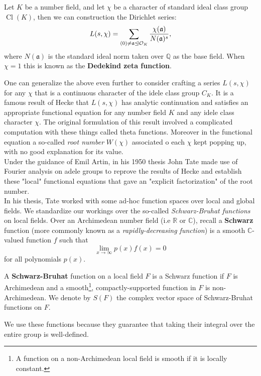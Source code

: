 \documentclass[11pt, x11names]{book}
\newcommand{\qq}{\mathbb{Q}}
\newcommand{\rr}{\mathbb{R}}
\newcommand{\cc}{\mathbb{C}}
\newcommand{\fraka}{\mathfrak{a}}
\newcommand{\ideal}{\trianglelefteq}
\DeclareMathOperator{\cl}{Cl}
\begin{document}
\begin{example}
\label{example: Generalized Dedekind Zeta}
Let $K$ be a number field, and let $\chi$ be a character of standard ideal class group $\cl(K)$, then we can construction the Dirichlet series:
\begin{equation*}
    L(s, \chi) = \sum_{(0) \neq \fraka \ideal \calo_K} \frac{\chi(\fraka)}{N(\fraka)^s},
\end{equation*}
where $N(\fraka)$ is the standard ideal norm taken over $\qq$ as the base field. When $\chi = 1$ this is known as the \textbf{Dedekind zeta function}.
\end{example}

One can generalize the above even further to consider crafting a series $L(s, \chi)$ for any $\chi$ that is a continuous character of the idele class group $C_K$. It is a famous result of Hecke that $L(s, \chi)$ has analytic continuation and satisfies an appropriate functional equation for any number field $K$ and any idele class character $\chi$. The original formulation of this result involved a complicated computation with these things called theta functions. Moreover in the functional equation a so-called \textit{root number} $W(\chi)$ associated o each $\chi$ kept popping up, with no good explanation for its value.\\
Under the guidance of Emil Artin, in his 1950 thesis John Tate made use of Fourier analysis on adele groups to reprove the results of Hecke and establish these "local" functional equations that gave an "explicit factorization" of the root number.\\

In his thesis, Tate worked with some ad-hoc function spaces over local and global fields. We standardize our workings over the so-called \textit{Schwarz-Bruhat functions} on local fields. Over an Archimedean number field (i.e $\rr$ or $\cc$), recall a \textbf{Schwarz} function (more commonly known as a \textit{rapidly-decreasing function}) is a smooth $\cc$-valued function $f$ such that
\begin{equation*}
    \lim_{x \to \infty} p(x)f(x) = 0
\end{equation*}
for all polynomials $p(x)$.
\begin{defn}
\label{def: Schwarz-Bruhat functions}
A \textbf{Schwarz-Bruhat} function on a local field $F$ is a Schwarz function if $F$ is Archimedean and a smooth\footnote{A function on a non-Archimedean local field is smooth if it is locally constant.}, compactly-supported function in $F$ is non-Archimedean. We denote by $S(F)$ the complex vector space of Schwarz-Bruhat functions on $F$.
\end{defn}
We use these functions because they guarantee that taking their integral over the entire group is well-defined.
\end{document}
